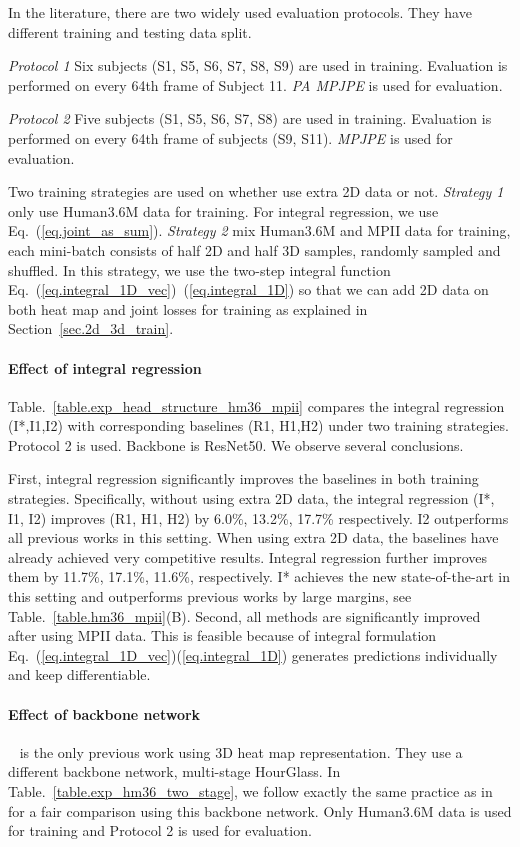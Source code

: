 \documentclass[runningheads]{llncs}
\begin{document}
In the literature, there are two widely used evaluation protocols. They have different training and testing data split.

\emph{Protocol 1} Six subjects (S1, S5, S6, S7, S8, S9) are used in training. Evaluation is performed on every 64th frame of Subject 11. \emph{PA MPJPE} is used for evaluation.

\emph{Protocol 2} Five subjects (S1, S5, S6, S7, S8) are used in training. Evaluation is performed on every 64th frame of subjects (S9, S11). \emph{MPJPE} is used for evaluation.

Two training strategies are used on whether use extra 2D data or not. \emph{Strategy 1} only use Human3.6M data for training. For integral regression, we use Eq.~(\ref{eq.joint_as_sum}). \emph{Strategy 2} mix Human3.6M and MPII data for training, each mini-batch consists of half 2D and half 3D samples, randomly sampled and shuffled. In this strategy, we use the two-step integral function Eq.~(\ref{eq.integral_1D_vec})~(\ref{eq.integral_1D}) so that we can add 2D data on both heat map and joint losses for training as explained in Section~\ref{sec.2d_3d_train}.

\paragraph{\textbf{Effect of integral regression}} Table.~\ref{table.exp_head_structure_hm36_mpii} compares the integral regression (I*,I1,I2) with corresponding baselines (R1, H1,H2) under two training strategies. Protocol 2 is used. Backbone is ResNet50. We observe several conclusions.

First, integral regression significantly improves the baselines in both training strategies. Specifically, without using extra 2D data, the integral regression (I*, I1, I2) improves (R1, H1, H2) by 6.0\%, 13.2\%, 17.7\% respectively. I2 outperforms all previous works in this setting. When using extra 2D data, the baselines have already achieved very competitive results. Integral regression further improves them by 11.7\%, 17.1\%, 11.6\%, respectively. I* achieves the new state-of-the-art in this setting and outperforms previous works by large margins, see Table.~\ref{table.hm36_mpii}(B). Second, all methods are significantly improved after using MPII data. This is feasible because of integral formulation Eq.~(\ref{eq.integral_1D_vec})(\ref{eq.integral_1D}) generates  predictions individually and keep differentiable.

\paragraph{\textbf{Effect of backbone network}} ~\cite{pavlakos2016coarse} is the only previous work using 3D heat map representation. They use a different backbone network, multi-stage HourGlass. In Table.~\ref{table.exp_hm36_two_stage}, we follow exactly the same practice as in~\cite{pavlakos2016coarse} for a fair comparison using this backbone network. Only Human3.6M data is used for training and Protocol 2 is used for evaluation.
\end{document}
